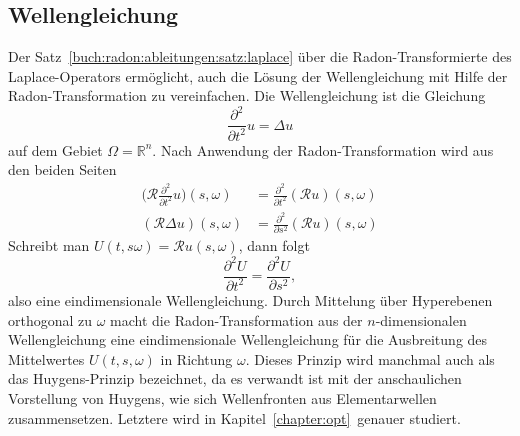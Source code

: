 %
%
\subsection{Wellengleichung
\label{buch:radon:ableitungen:subsection:wellengleichung}}
Der Satz~\ref{buch:radon:ableitungen:satz:laplace} über die
Radon-Transformierte des Laplace-Operators ermöglicht, auch die
Lösung der Wellengleichung mit Hilfe der Radon-Transformation zu
vereinfachen.
Die Wellengleichung ist die Gleichung
\[
\frac{\partial^2}{\partial t^2}u = \Delta u
\]
auf dem Gebiet $\Omega=\mathbb{R}^n$.
Nach Anwendung der Radon-Transformation wird aus den beiden Seiten
\begin{align*}
\biggl(\mathscr{R}\frac{\partial^2}{\partial t^2}u\biggr)(s,\omega)
&=
\frac{\partial^2}{\partial t^2}(\mathscr{R}u)(s,\omega)
\\
(\mathscr{R}\Delta u)(s,\omega)
&=
\frac{\partial^2}{\partial s^2}(\mathscr{R}u)(s,\omega)
\end{align*}
Schreibt man $U(t,s\omega)=\mathscr{R}u(s,\omega)$, dann folgt
\[
\frac{\partial^2 U}{\partial t^2}
=
\frac{\partial^2 U}{\partial s^2},
\]
also eine eindimensionale Wellengleichung.
Durch Mittelung über Hyperebenen orthogonal zu $\omega$ macht
die Radon-Transformation aus der $n$-dimensionalen Wellengleichung
eine eindimensionale Wellengleichung für die Ausbreitung des
Mittelwertes $U(t,s,\omega)$ in Richtung $\omega$.
Dieses Prinzip wird manchmal auch als das Huygens-Prinzip 
bezeichnet, da es verwandt ist mit der anschaulichen Vorstellung
von Huygens, wie sich Wellenfronten aus Elementarwellen zusammensetzen.
Letztere wird in Kapitel~\ref{chapter:opt} genauer studiert.


